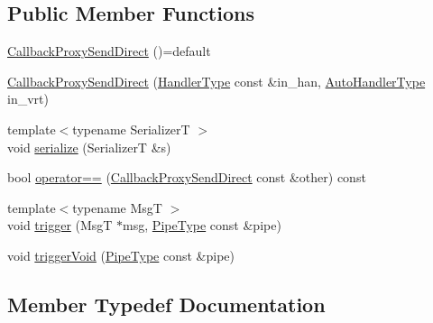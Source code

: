 \subsection*{Public Member Functions}
\begin{DoxyCompactItemize}
\item 
\hyperlink{structvt_1_1pipe_1_1callback_1_1_callback_proxy_send_direct_a9dd9c90d3e2b112d9df3c04626d6c272}{Callback\+Proxy\+Send\+Direct} ()=default
\item 
\hyperlink{structvt_1_1pipe_1_1callback_1_1_callback_proxy_send_direct_a505c5f6b4fe250a4c1f049e77271dbfe}{Callback\+Proxy\+Send\+Direct} (\hyperlink{namespacevt_af64846b57dfcaf104da3ef6967917573}{Handler\+Type} const \&in\+\_\+han, \hyperlink{structvt_1_1pipe_1_1callback_1_1_callback_proxy_send_direct_adbd70e6c1d6b374083e5d0babdcab07e}{Auto\+Handler\+Type} in\+\_\+vrt)
\item 
{\footnotesize template$<$typename SerializerT $>$ }\\void \hyperlink{structvt_1_1pipe_1_1callback_1_1_callback_proxy_send_direct_a1a64835cb030af898ad2beaec56d7887}{serialize} (SerializerT \&s)
\item 
bool \hyperlink{structvt_1_1pipe_1_1callback_1_1_callback_proxy_send_direct_a8ccc6351627fe71b4ca82d2ce2a5a7c1}{operator==} (\hyperlink{structvt_1_1pipe_1_1callback_1_1_callback_proxy_send_direct}{Callback\+Proxy\+Send\+Direct} const \&other) const
\item 
{\footnotesize template$<$typename MsgT $>$ }\\void \hyperlink{structvt_1_1pipe_1_1callback_1_1_callback_proxy_send_direct_a17ec0811bb79213d0b99c7f7bcfa697d}{trigger} (MsgT $\ast$msg, \hyperlink{namespacevt_ac9852acda74d1896f48f406cd72c7bd3}{Pipe\+Type} const \&pipe)
\item 
void \hyperlink{structvt_1_1pipe_1_1callback_1_1_callback_proxy_send_direct_a76e8f94a55e1855087d149a498953492}{trigger\+Void} (\hyperlink{namespacevt_ac9852acda74d1896f48f406cd72c7bd3}{Pipe\+Type} const \&pipe)
\end{DoxyCompactItemize}


\subsection{Member Typedef Documentation}
\mbox{\label{structvt_1_1pipe_1_1callback_1_1_callback_proxy_send_direct_adbd70e6c1d6b374083e5d0babdcab07e}} 
